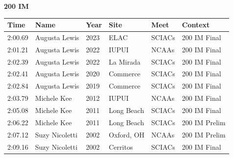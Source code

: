 \vspace{1.2em}
\noindent\begin{minipage}[t]{0.98\textwidth}
\centering
\textbf{\textcolor{teamprimary}{200 IM}}\par
\vspace{0.5em}
\centering
\small
\renewcommand{\arraystretch}{1.0}
\setlength{\tabcolsep}{4pt}
\begin{tabular}{@{}p{2.0cm}p{3.2cm}p{1.2cm}p{2.0cm}p{2.0cm}p{2.5cm}@{}}
\toprule
\textbf{Time} & \textbf{Name} & \textbf{Year} & \textbf{Site} & \textbf{Meet} & \textbf{Context} \\
\midrule
2:00.69 & Augusta Lewis & 2023 & ELAC & SCIACs & 200 IM Final \\
2:01.21 & Augusta Lewis & 2022 & IUPUI & NCAAs & 200 IM Final \\
2:02.39 & Augusta Lewis & 2022 & La Mirada & SCIACs & 200 IM Final \\
2:02.41 & Augusta Lewis & 2020 & Commerce & SCIACs & 200 IM Final \\
2:02.84 & Augusta Lewis & 2019 & Commerce & SCIACs & 200 IM Final \\
2:03.79 & Michele Kee & 2012 & IUPUI & NCAAs & 200 IM Final \\
2:05.08 & Michele Kee & 2011 & Long Beach & SCIACs & 200 IM Final \\
2:06.22 & Michele Kee & 2011 & Long Beach & SCIACs & 200 IM Prelim \\
2:07.12 & Suzy Nicoletti & 2002 & Oxford, OH & NCAAs & 200 IM Prelim \\
2:09.16 & Suzy Nicoletti & 2002 & Cerritos & SCIACs & 200 IM Final \\
\bottomrule
\end{tabular}
\end{minipage}
\vspace{1.2em}
